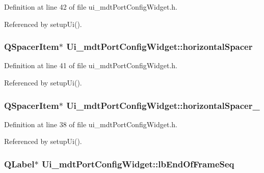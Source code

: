 Definition at line 42 of file ui\-\_\-mdt\-Port\-Config\-Widget.\-h.



Referenced by setup\-Ui().

\hypertarget{class_ui__mdt_port_config_widget_a97589c828c3f0820865493e946f59a07}{
\subsubsection[{horizontal\-Spacer}]{\setlength{\rightskip}{0pt plus 5cm}Q\-Spacer\-Item$\ast$ Ui\-\_\-mdt\-Port\-Config\-Widget\-::horizontal\-Spacer}}\label{class_ui__mdt_port_config_widget_a97589c828c3f0820865493e946f59a07}


Definition at line 41 of file ui\-\_\-mdt\-Port\-Config\-Widget.\-h.



Referenced by setup\-Ui().

\hypertarget{class_ui__mdt_port_config_widget_ae5f3f9e6cec6a29a322810cb540142b1}{
\subsubsection[{horizontal\-Spacer\-\_\-2}]{\setlength{\rightskip}{0pt plus 5cm}Q\-Spacer\-Item$\ast$ Ui\-\_\-mdt\-Port\-Config\-Widget\-::horizontal\-Spacer\-\_}}\label{class_ui__mdt_port_config_widget_ae5f3f9e6cec6a29a322810cb540142b1}


Definition at line 38 of file ui\-\_\-mdt\-Port\-Config\-Widget.\-h.



Referenced by setup\-Ui().

\hypertarget{class_ui__mdt_port_config_widget_ad5562fe2796e0be78a753112e6635f22}{
\subsubsection[{lb\-End\-Of\-Frame\-Seq}]{\setlength{\rightskip}{0pt plus 5cm}Q\-Label$\ast$ Ui\-\_\-mdt\-Port\-Config\-Widget\-::lb\-End\-Of\-Frame\-Seq}}\label{class_ui__mdt_port_config_widget_ad5562fe2796e0be78a753112e6635f22}


